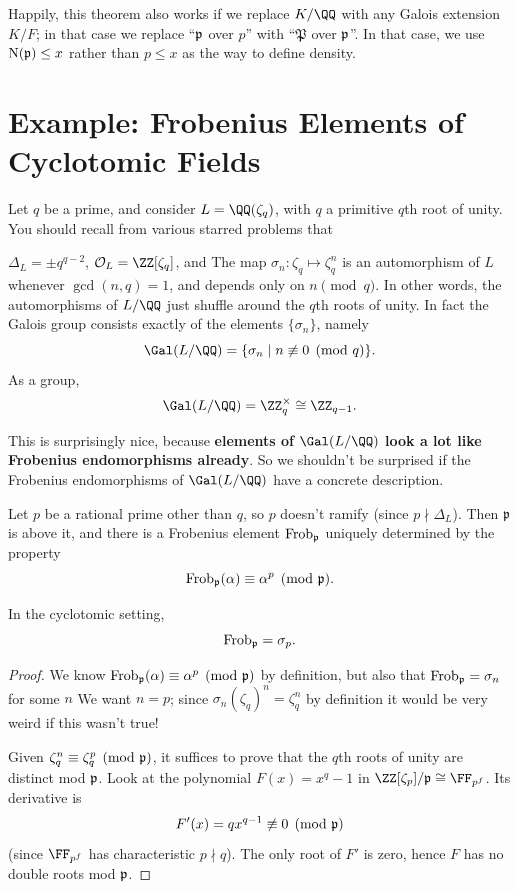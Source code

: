 \begin{remark}
Happily, this theorem also works if we replace $K/\QQ$ with any Galois extension $K/F$;
in that case we replace ``$\mathfrak p$ over $p$'' with ``$\mathfrak P$ over $\mathfrak p$''.
In that case, we use $\operatorname{N}(\mathfrak p) \le x$ rather than $p \le x$ as the way
to define density.
\end{remark}

\section{Example: Frobenius Elements of Cyclotomic Fields}
Let $q$ be a prime, and consider $L = \QQ(\zeta_q)$, with $q$ a primitive $q$th root of unity.
You should recall from various starred problems that
\begin{itemize}
	\ii $\Delta_L = \pm q^{q-2}$,
	\ii $\OO_L = \ZZ[\zeta_q]$, and
	\ii The map $\sigma_n : \zeta_q \mapsto \zeta_q^n$ is an automorphism of $L$ whenever $\gcd(n,q)=1$,
	and depends only on $n \pmod q$.
	In other words, the automorphisms of $L/\QQ$ just shuffle around the $q$th roots of unity.
	In fact the Galois group consists exactly of the elements $\{\sigma_n\}$, namely
	\[ \Gal(L/\QQ) = \{ \sigma_n \mid n \not\equiv 0 \pmod q \}. \]
	As a group, \[ \Gal(L/\QQ) = \Zm q \cong \ZZ_{q-1}. \]
\end{itemize}
This is surprisingly nice, because \textbf{elements of $\Gal(L/\QQ)$ look
a lot like Frobenius endomorphisms already}.
So we shouldn't be surprised if the Frobenius endomorphisms of $\Gal(L/\QQ)$
have a concrete description.

Let $p$ be a rational prime other than $q$, so $p$ doesn't ramify (since $p \nmid \Delta_L$).
Then $\mathfrak p$ is above it, and there is a Frobenius element $\mathrm{Frob}_\mathfrak p$ uniquely determined by the property
\[ \mathrm{Frob}_\mathfrak p(\alpha) \equiv \alpha^p \pmod{\mathfrak p}. \]

\begin{lemma}
	\label{lem:cyclo_frob}
	In the cyclotomic setting, \[ \mathrm{Frob}_\mathfrak p = \sigma_p. \]
\end{lemma}
\begin{proof}
	We know $\mathrm{Frob}_\mathfrak p(\alpha) \equiv \alpha^p \pmod{\mathfrak p}$ by definition,
	but also that $\mathrm{Frob}_\mathfrak p = \sigma_n$ for some $n$
	We want $n=p$; since $\sigma_n(\zeta_q)^n = \zeta_q^n$ by definition
	it would be very weird if this wasn't true!
	
	Given $\zeta_q^n \equiv \zeta_q^p \pmod{\mathfrak p}$, it suffices to
	prove that the $q$th roots of unity are distinct mod $\mathfrak p$.
	Look at the polynomial $F(x) = x^q-1$ in $\ZZ[\zeta_p]/\pp \cong \FF_{p^f}$.
	Its derivative is \[ F'(x) = qx^{q-1} \not\equiv 0 \pmod{\mathfrak p} \]
	(since $\FF_{p^f}$ has characteristic $p \nmid q$).
	The only root of $F'$ is zero, hence $F$ has no double roots mod $\mathfrak p$.
\end{proof}

